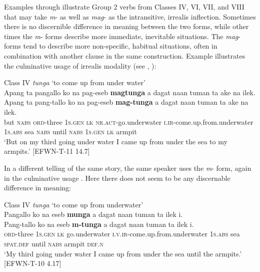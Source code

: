 Examples  through  illustrate Group 2 verbs from Classes IV, VI, VII, and VIII that may take \textit{m}{}- as well as \textit{mag}{}- as the intransitive, irrealis inflection. Sometimes there is no discernible difference in meaning between the two forms, while other times the \textit{m}{}- forms describe more immediate, inevitable situations. The \textit{mag}{}- forms tend to describe more non-specific, habitual situations, often in combination with another clause in the same construction. Example  illustrates the culminative usage of irrealis modality (see , ):

\ea
\label{bkm:Ref150434299}Class IV \textit{tunga} ‘to come up from under water’ \\
Apang  ta  pangallo  ko  na  pag-eseb \textbf{magtunga}  a  dagat  naan  tuman  ta  ake  na  ilek. \\\smallskip
\gll Apang  ta  pang-tallo  ko  na  pag-eseb \textbf{mag-tunga}  a  dagat  naan  tuman  ta  ake  na  ilek. \\
but  \textsc{nabs}  \textsc{ord}-three  1\textsc{s.gen}  \textsc{lk}  \textsc{nr.act}-go.underwater  \textsc{i.ir}-come.up.from.underwater  1\textsc{s.abs}  sea  \textsc{nabs}  until  \textsc{nabs}  1\textsc{s.gen}  \textsc{lk}  armpit \\
\glt ‘But on my third going under water I came up from under the sea to my armpits.’ [EFWN-T-11 14.7]
\z

In a different telling of the same story, the same speaker uses the \textit{m}{}- form, again in the culminative usage . Here there does not seem to be any discernable difference in meaning:

\ea
\label{bkm:Ref150434555}Class IV \textit{tunga} ‘to come up from underwater’ \\
Pangallo  ko  na  eseb  \textbf{munga}  a  dagat naan  tuman  ta  ilek  i. \\\smallskip
\gll Pang-tallo  ko  na  eseb  \textbf{m-tunga}  a  dagat naan  tuman  ta  ilek  i. \\
\textsc{ord}-three  1\textsc{s.gen}  \textsc{lk}  go.underwater  \textsc{i.v.ir}-come.up.from.underwater  1\textsc{s.abs}  sea
\textsc{spat.def}   until  \textsc{nabs}  armpit  \textsc{def.n} \\
\glt ‘My third going under water I came up from under the sea until the armpits.’ [EFWN-T-10 4.17]
\z

